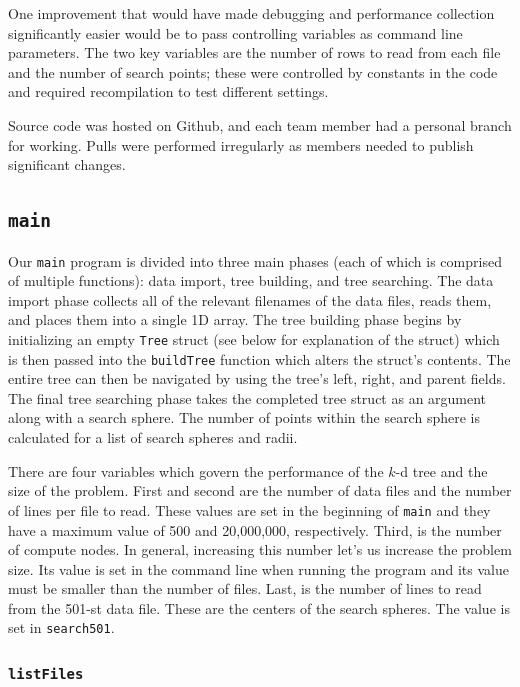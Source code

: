 \documentclass{article}
\begin{document}
One improvement that would have made debugging and performance collection significantly easier would be to pass controlling variables as command line parameters. The two key variables are the number of rows to read from each file and the number of search points; these were controlled by constants in the code and required recompilation to test different settings.

Source code was hosted on Github, and each team member had a personal branch for working. Pulls were performed irregularly as members needed to publish significant changes.


%
%

\subsection{\texttt{main}}

Our \texttt{main} program is divided into three main phases (each of which is comprised of multiple functions): data import, tree building, and tree searching. The data import phase collects all of the relevant filenames of the data files, reads them, and places them into a single 1D array. The tree building phase begins by initializing an empty \texttt{Tree} struct (see below for explanation of the struct) which is then passed into the \texttt{buildTree} function which alters the struct's contents. The entire tree can then be navigated by using the tree's left, right, and parent fields. The final tree searching phase takes the completed tree struct as an argument along with a search sphere. The number of points within the search sphere is calculated for a list of search spheres and radii.

There are four variables which govern the performance of the $k$-d tree and the size of the problem. First and second are the number of data files and the number of lines per file to read. These values are set in the beginning of \texttt{main} and they have a maximum value of 500 and 20,000,000, respectively. Third, is the number of compute nodes. In general, increasing this number let's us increase the problem size. Its value is set in the command line when running the program and its value must be smaller than the number of files. Last, is the number of lines to read from the 501-st data file. These are the centers of the search spheres. The value is set in \texttt{search501}.


%
%

\subsubsection{\texttt{listFiles}}\label{sec:listfiles}
\end{document}
